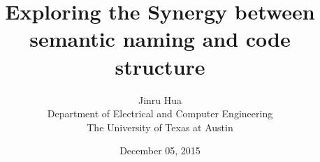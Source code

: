 \documentclass[12pt]{article}
\begin{document}
\title{Exploring the Synergy between semantic naming and code structure}

\author{Jinru Hua \\
        Department of Electrical and Computer Engineering  \\
The University of Texas at Austin}  
\date{December 05, 2015}

\maketitle

%




\end{document}
